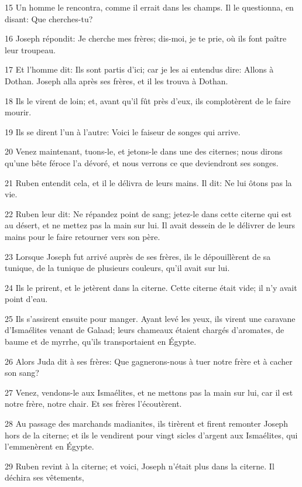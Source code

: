 \par 15 Un homme le rencontra, comme il errait dans les champs. Il le questionna, en disant: Que cherches-tu?
\par 16 Joseph répondit: Je cherche mes frères; dis-moi, je te prie, où ils font paître leur troupeau.
\par 17 Et l'homme dit: Ils sont partis d'ici; car je les ai entendus dire: Allons à Dothan. Joseph alla après ses frères, et il les trouva à Dothan.
\par 18 Ils le virent de loin; et, avant qu'il fût près d'eux, ils complotèrent de le faire mourir.
\par 19 Ils se dirent l'un à l'autre: Voici le faiseur de songes qui arrive.
\par 20 Venez maintenant, tuons-le, et jetons-le dans une des citernes; nous dirons qu'une bête féroce l'a dévoré, et nous verrons ce que deviendront ses songes.
\par 21 Ruben entendit cela, et il le délivra de leurs mains. Il dit: Ne lui ôtons pas la vie.
\par 22 Ruben leur dit: Ne répandez point de sang; jetez-le dans cette citerne qui est au désert, et ne mettez pas la main sur lui. Il avait dessein de le délivrer de leurs mains pour le faire retourner vers son père.
\par 23 Lorsque Joseph fut arrivé auprès de ses frères, ils le dépouillèrent de sa tunique, de la tunique de plusieurs couleurs, qu'il avait sur lui.
\par 24 Ils le prirent, et le jetèrent dans la citerne. Cette citerne était vide; il n'y avait point d'eau.
\par 25 Ils s'assirent ensuite pour manger. Ayant levé les yeux, ils virent une caravane d'Ismaélites venant de Galaad; leurs chameaux étaient chargés d'aromates, de baume et de myrrhe, qu'ils transportaient en Égypte.
\par 26 Alors Juda dit à ses frères: Que gagnerons-nous à tuer notre frère et à cacher son sang?
\par 27 Venez, vendons-le aux Ismaélites, et ne mettons pas la main sur lui, car il est notre frère, notre chair. Et ses frères l'écoutèrent.
\par 28 Au passage des marchands madianites, ils tirèrent et firent remonter Joseph hors de la citerne; et ils le vendirent pour vingt sicles d'argent aux Ismaélites, qui l'emmenèrent en Égypte.
\par 29 Ruben revint à la citerne; et voici, Joseph n'était plus dans la citerne. Il déchira ses vêtements,

